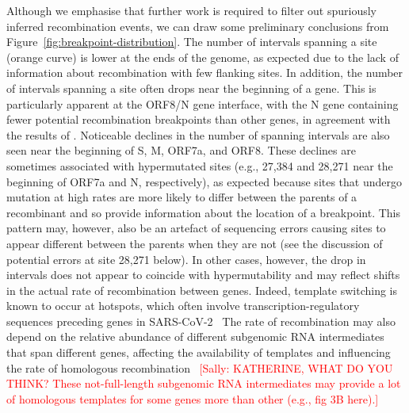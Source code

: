 \documentclass{article}
\newcommand{\sally}[1]{\textcolor{red}{#1}}
\begin{document}
Although we emphasise that further work is required to filter out spuriously inferred recombination events,
we can draw some preliminary conclusions from Figure~\ref{fig:breakpoint-distribution}.
The number of intervals spanning a site (orange curve) is lower at the ends of the genome,
as expected due to the lack of information about recombination with few flanking sites.
In addition, the number of intervals spanning a site often
drops near the beginning of a gene.
This is particularly apparent at the ORF8/N gene interface,
with the N gene containing fewer potential recombination breakpoints
than other genes, in agreement with the results of \cite{Turakhia2022-it}.
Noticeable declines in the number of spanning intervals are also
seen near the beginning of S, M, ORF7a, and ORF8.
These declines are sometimes associated with hypermutated sites (e.g., 27,384 and 28,271
near the beginning of ORF7a and N, respectively), as expected because sites that
undergo mutation at high rates are more likely to differ between the
parents of a recombinant and so provide information about the location of a breakpoint.
This pattern may, however, also be an artefact of sequencing errors causing sites
to appear different between the parents when they are not
(see the discussion of potential errors at site 28,271 below).
In other cases, however, the drop in intervals does not appear to
coincide with hypermutability and may reflect shifts in the actual
rate of recombination between genes.
Indeed, template switching is known to occur at hotspots,
which often involve transcription-regulatory sequences preceding genes
in SARS-CoV-2~\citep{Yang2021-characterizing}
The rate of recombination may also depend on the relative abundance
of different subgenomic RNA intermediates that span different genes,
affecting the availability of templates and influencing the rate of
homologous recombination~\citep{Kim2020-gt,Zou2021-sars}
\sally{[Sally: KATHERINE, WHAT DO YOU THINK?  These not-full-length subgenomic RNA intermediates may provide a lot of homologous templates for some genes more than other (e.g., fig 3B here).]}
\end{document}

